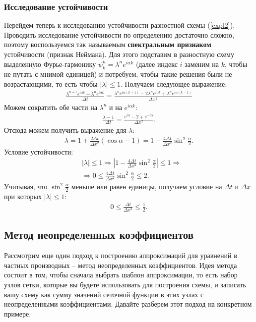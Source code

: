 \documentclass[12pt]{article}
\newcommand{\dt}{\Delta t}
\newcommand{\dx}{\Delta x}
\begin{document}
\subsubsection{Исследование устойчивости}
Перейдем теперь к исследованию устойчивости разностной схемы (\ref{expl2}). Проводить исследование устойчивости по определению достаточно сложно, поэтому воспользуемся так называемым \textbf{спектральным признаком} устойчивости (признак Неймана). Для этого подставим в разностную схему выделенную Фурье-гармонику $\psi_k^n=\lambda^n e^{i\alpha k}$ (далее индекс $i$ заменим на $k$, чтобы не путать с мнимой единицей) и потребуем, чтобы такие решения были не возрастающими, то есть чтобы $|\lambda| \le 1$. Получаем следующее выражение:
\begin{align}
\frac{\lambda^{n+1} e^{i\alpha k}-\lambda^{n} e^{i\alpha k}}{\dt} = \frac{\lambda^{n} e^{i\alpha (k+1)}-2\lambda^{n} e^{i\alpha k}+\lambda^{n} e^{i\alpha (k-1)}}{\dx^2}
\end{align}
Можем сократить обе части на $\lambda^n$ и на $e^{i\alpha k}$:
\begin{align}
\frac{\lambda - 1}{\dt} = \frac{e^{i\alpha} - 2 +e^{-i\alpha}}{\dx^2}.
\end{align}
Отсюда можем получить выражение для $\lambda$:
\begin{align}
\lambda =1 +\frac{2\dt}{\dx^2} (\cos{\alpha}-1) = 1 - \frac{4\dt}{\dx^2} \sin^2\frac{\alpha}{2}.
\end{align}
Условие устойчивости:
\begin{align}
&|\lambda|\le 1 \Rightarrow  \left|1 - \frac{4\dt}{\dx^2} \sin^2\frac{\alpha}{2}\right| \le 1 \Rightarrow \\
&\Rightarrow 0 \le \frac{4\dt}{\dx^2} \sin^2\frac{\alpha}{2} \le 2.
\end{align}
Учитывая, что $\sin^2\frac{\alpha}{2}$ меньше или равен единицы, получаем условие на $\dt$ и $\dx$ при которых $|\lambda|\le1$:
\begin{align}
0\le\frac{\dt}{\dx^2}\le\frac{1}{2}.
\end{align}
\subsection{Метод неопределенных коэффициентов}
Рассмотрим еще один подход к построению аппроксимаций для уравнений в частных производных -- метод неопределенных коэффициентов. Идея метода состоит в том, чтобы сначала выбрать шаблон аппроксимации, то есть набор узлов сетки, которые вы будете использовать для построения схемы, и записать вашу схему как сумму значений сеточной функции в этих узлах с неопределенными коэффициентами. Давайте разберем этот подход на конкретном примере.
\end{document}
